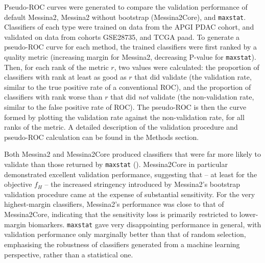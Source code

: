 \documentclass[dissertation.tex]{subfiles}
\begin{document}
Pseudo-\gls{ROC} curves were generated to compare the validation performance of default Messina2, Messina2 without bootstrap (Messina2Core), and \texttt{maxstat}.  Classifiers of each type were trained on data from the \gls{APGI} \gls{PDAC} cohort, and validated on data from cohorts GSE28735, and \gls{TCGA} paad.  To generate a pseudo-\gls{ROC} curve for each method, the trained classifiers were first ranked by a quality metric (increasing margin for Messina2, decreasing P-value for \texttt{maxstat}).  Then, for each rank of the metric $r$, two values were calculated: the proportion of classifiers with rank at least as good as $r$ that did validate (the validation rate, similar to the true positive rate of a conventional \gls{ROC}), and the proportion of classifiers with rank worse than $r$ that did \emph{not} validate (the non-validation rate, similar to the false positive rate of \gls{ROC}).  The pseudo-\gls{ROC} is then the curve formed by plotting the validation rate against the non-validation rate, for all ranks of the metric.  A detailed description of the validation procedure and pseudo-ROC calculation can be found in the Methods section.

Both Messina2 and Messina2Core produced classifiers that were far more likely to validate than those returned by \texttt{maxstat} ().  Messina2Core in particular demonstrated excellent validation performance, suggesting that -- at least for the objective $f_H$ -- the increased stringency introduced by Messina2's bootstrap validation procedure came at the expense of substantial sensitivity.  For the very highest-margin classifiers, Messina2's performance was close to that of Messina2Core, indicating that the sensitivity loss is primarily restricted to lower-margin biomarkers.  \texttt{maxstat} gave very disappointing performance in general, with validation performance only marginally better than that of random selection, emphasising the robustness of classifiers generated from a machine learning perspective, rather than a statistical one.
\end{document}
